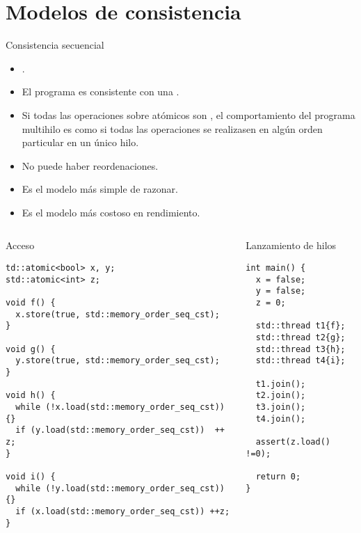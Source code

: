 \section{Modelos de consistencia}

\begin{frame}[t]{Consistencia secuencial}
\begin{itemize}
  \item {}.
  \item El programa es consistente con una .
  \item Si todas las operaciones sobre atómicos son , 
        el comportamiento del programa multihilo es como si todas las operaciones 
        se realizasen en algún orden particular en un único hilo.
  \item No puede haber reordenaciones.
  \item Es el modelo más simple de razonar.
  \item Es el modelo más costoso en rendimiento.
\end{itemize}
\end{frame}

\begin{frame}[fragile]
\begin{columns}

\begin{column}{.6\textwidth}
\begin{block}{Acceso}
\begin{lstlisting}
td::atomic<bool> x, y;
std::atomic<int> z;

void f() {
  x.store(true, std::memory_order_seq_cst);
}

void g() {
  y.store(true, std::memory_order_seq_cst);
}

void h() {
  while (!x.load(std::memory_order_seq_cst)) {}
  if (y.load(std::memory_order_seq_cst))  ++ z;
}

void i() {
  while (!y.load(std::memory_order_seq_cst)) {}
  if (x.load(std::memory_order_seq_cst)) ++z;
}
\end{lstlisting}
\end{block}
\end{column}

\pause

\begin{column}{.4\textwidth}
\begin{block}{Lanzamiento de hilos}
\begin{lstlisting}
int main() {
  x = false;
  y = false;
  z = 0;

  std::thread t1{f};
  std::thread t2{g};
  std::thread t3{h};
  std::thread t4{i};

  t1.join();
  t2.join();
  t3.join();
  t4.join();

  assert(z.load() !=0);

  return 0;
}
\end{lstlisting}
\end{block}
\end{column}

\end{columns}
\end{frame}


